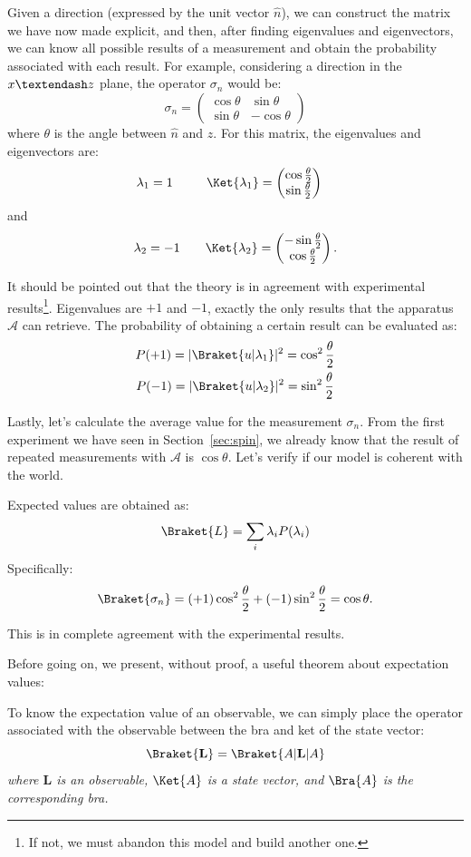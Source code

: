 Given a direction (expressed by the unit vector $\hat{n}$), we can construct the matrix we have now made explicit, and then, after finding eigenvalues and eigenvectors, we can know all possible results of a measurement and obtain the probability associated with each result. For example, considering a direction in the $x\textendash z$ plane, the operator $\sigma_n$ would be:
\[
\sigma_n = 
\begin{pmatrix}
	\cos\theta & \sin\theta\\
	\sin\theta & -\cos\theta
\end{pmatrix} 	
\]
where $\theta$ is the angle between $\hat{n}$ and $z$. For this matrix, the eigenvalues and eigenvectors are:
\[
\lambda_1 = 1 \quad\quad\ \  \Ket{\lambda_1}=
\begin{pmatrix}
	\cos\frac{\theta}{2}\\
	\sin\frac{\theta}{2}
\end{pmatrix} \quad
\]
and
\[
\lambda_2 = -1 \quad\quad \Ket{\lambda_2}=
\begin{pmatrix}
	-\sin\frac{\theta}{2}\\
	\cos\frac{\theta}{2}
\end{pmatrix}.
\]

It should be pointed out that the theory is in agreement with experimental results\footnote{If not, we must abandon this model and build another one.}. Eigenvalues are $+1$ and $-1$, exactly the only results that the apparatus $\mathcal{A}$ can retrieve. The probability of obtaining a certain result can be evaluated as:
\begin{gather*}
	P(+1) = |\Braket{u|\lambda_1}|^2 = \cos^2\frac{\theta}{2}\\
	P(-1) = |\Braket{u|\lambda_2}|^2 = \sin^2\frac{\theta}{2}
\end{gather*}

Lastly, let's calculate the average value for the measurement $\sigma_n$. From the first experiment we have seen in Section~\ref{sec:spin}, we already know that the result of repeated measurements with $\mathcal{A}$ is $\cos\theta$. Let's verify if our model is coherent with the world.

Expected values are obtained as:
\[
\Braket{L} = \sum_{i}\lambda_iP(\lambda_i)
\]
Specifically:
\[
\Braket{\sigma_n} = (+1)\cos^2\frac{\theta}{2} + (-1)\sin^2\frac{\theta}{2} = \cos\theta.
\]

This is in complete agreement with the experimental results.

Before going on, we present, without proof, a useful theorem about expectation values:
\begin{theorem}
	To know the expectation value of an observable, we can simply place the operator associated with the observable between the bra and ket of the state vector:
	\begin{equation}
		\label{eqn:exp}
		\Braket{\mathbf{L}} = \Braket{A|\mathbf{L}|A}
	\end{equation}
	\emph{where $\mathbf{L}$ is an observable, $\Ket{A}$ is a state vector, and $\Bra{A}$ is the corresponding bra.}
\end{theorem}


